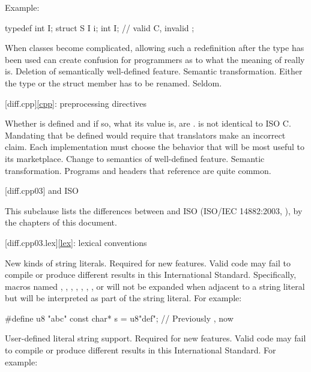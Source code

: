 Example:

\begin{codeblock}
typedef int I;
struct S {
  I i;
  int I;                  // valid C, invalid \Cpp{}
};
\end{codeblock}
\rationale
When classes become complicated, allowing such a redefinition
after the type has been used can create confusion for \Cpp{}
programmers as to what the meaning of  really is.
\effect
Deletion of semantically well-defined feature.
\difficulty
Semantic transformation.
Either the type or the struct member has to be renamed.
\howwide
Seldom.

[diff.cpp]{\ref{cpp}: preprocessing directives}

\change
Whether  is defined and if so, what its value is, are
.
\rationale
\Cpp{} is not identical to ISO C\@.
Mandating that 
be defined would require that translators make an incorrect claim.
Each implementation must choose the behavior that will be most
useful to its marketplace.
\effect
Change to semantics of well-defined feature.
\difficulty
Semantic transformation.
\howwide
Programs and headers that reference  are
quite common.

[diff.cpp03]{\Cpp{} and ISO \CppIII{}}

\pnum
{}%
This subclause lists the differences between \Cpp{} and
ISO \CppIII{} (ISO/IEC 14882:2003, ),
by the chapters of this document.

[diff.cpp03.lex]{\ref{lex}: lexical conventions}

\change
New kinds of string literals.
\rationale
Required for new features.
\effect
Valid \CppIII{} code may fail to compile or produce different results in
this International Standard. Specifically, macros named , ,
, , , , , or  will
not be expanded when adjacent to a string literal but will be interpreted as
part of the string literal. For example:

\begin{codeblock}
#define u8 "abc"
const char* s = u8"def";        // Previously , now 
\end{codeblock}

\change
User-defined literal string support.
\rationale
Required for new features.
\effect
Valid \CppIII{} code may fail to compile or produce different results in
this International Standard.
For example:

